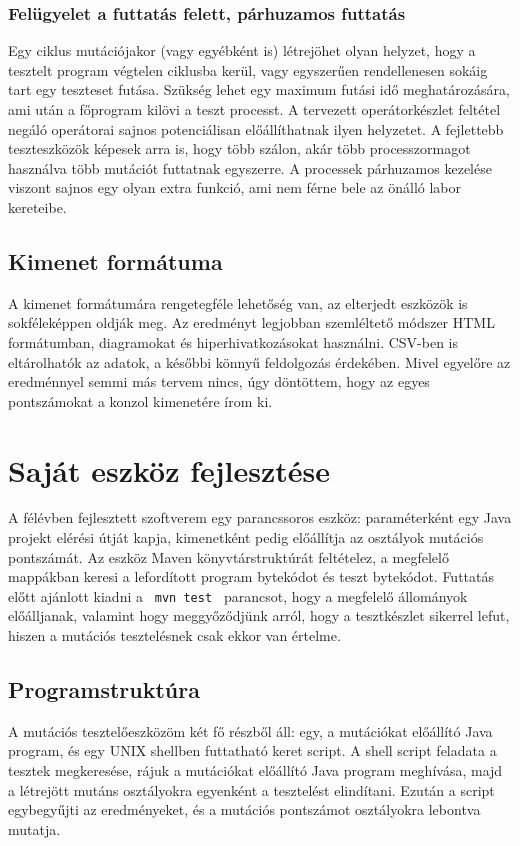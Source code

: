 \subsubsection{Felügyelet a futtatás felett, párhuzamos futtatás}
Egy ciklus mutációjakor (vagy egyébként is) létrejöhet olyan helyzet, hogy a tesztelt program végtelen ciklusba kerül, vagy egyszerűen rendellenesen sokáig tart egy teszteset futása. Szükség lehet egy maximum futási idő meghatározására, ami után a főprogram kilövi a teszt processt. A tervezett operátorkészlet feltétel negáló operátorai sajnos potenciálisan előállíthatnak ilyen helyzetet. A fejlettebb teszteszközök képesek arra is, hogy több szálon, akár több processzormagot használva több mutációt futtatnak egyszerre. A processek párhuzamos kezelése viszont sajnos egy olyan extra funkció, ami nem férne bele az önálló labor kereteibe.
\subsection{Kimenet formátuma}
A kimenet formátumára rengetegféle lehetőség van, az elterjedt eszközök is sokféleképpen oldják meg. Az eredményt legjobban szemléltető módszer HTML formátumban, diagramokat és hiperhivatkozásokat használni. CSV-ben is eltárolhatók az adatok, a későbbi könnyű feldolgozás érdekében. Mivel egyelőre az eredménnyel semmi más tervem nincs, úgy döntöttem, hogy az egyes pontszámokat a konzol kimenetére írom ki.
\section{Saját eszköz fejlesztése}
A félévben fejlesztett szoftverem egy parancssoros eszköz: paraméterként egy Java projekt elérési útját kapja, kimenetként pedig előállítja az osztályok mutációs pontszámát. Az eszköz Maven könyvtárstruktúrát feltételez, a megfelelő mappákban keresi a lefordított program bytekódot és teszt bytekódot. Futtatás előtt ajánlott kiadni a \lstinline{ mvn test } parancsot, hogy a megfelelő állományok előálljanak, valamint hogy meggyőződjünk arról, hogy a tesztkészlet sikerrel lefut, hiszen a mutációs tesztelésnek csak ekkor van értelme.
\subsection{Programstruktúra}
A mutációs tesztelőeszközöm két fő részből áll: egy, a mutációkat előállító Java program, és egy UNIX shellben futtatható keret script. A shell script feladata a tesztek megkeresése, rájuk a mutációkat előállító Java program meghívása, majd a létrejött mutáns osztályokra egyenként a tesztelést elindítani. Ezután a script egybegyűjti az eredményeket, és a mutációs pontszámot osztályokra lebontva mutatja.
